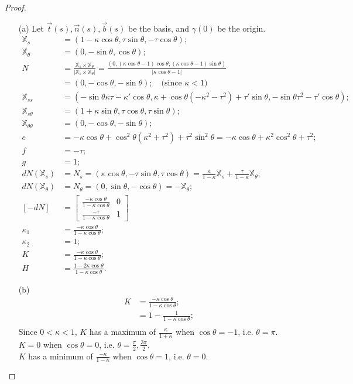 \documentclass[10pt,a4paper]{article}
\begin{document}
\begin{proof}
\begin{enumerate}
\item[(a)] 
Let $\vec{t}(s), \vec{n}(s), \vec{b}(s)$ be the basis, and $\gamma(0)$ be the origin.
\begin{align*}
\mathbb{X}_{s} &= (1 - \kappa\cos\theta, \tau\sin\theta, -\tau\cos\theta); \\
\mathbb{X}_{\theta} &= (0, -\sin\theta, \cos\theta); \\
N &= \frac{\mathbb{X}_{s} \times \mathbb{X}_{\theta}}{|\mathbb{X}_{s} \times \mathbb{X}_{\theta}|} = \frac{(0, (\kappa\cos\theta - 1)\cos\theta, (\kappa\cos\theta - 1)\sin\theta)}{|\kappa\cos\theta - 1|} \\
  &= (0, -\cos\theta, -\sin\theta); \quad\text{(since $\kappa< 1$)} \\
\mathbb{X}_{ss} &= (-\sin\theta\kappa\tau - \kappa'\cos\theta, \kappa + \cos\theta(-\kappa^2 - \tau^2) + \tau'\sin\theta, -\sin\theta\tau^2 - \tau'\cos\theta); \\
\mathbb{X}_{s\theta} &= (1 + \kappa\sin\theta, \tau\cos\theta, \tau\sin\theta); \\
\mathbb{X}_{\theta\theta} &= (0, -\cos\theta, -\sin\theta); \\
e &= -\kappa\cos\theta + \cos^2\theta(\kappa^2 + \tau^2) + \tau^2\sin^2\theta = -\kappa\cos\theta + \kappa^2\cos^2\theta + \tau^2; \\
f &= -\tau; \\
g &= 1; \\
dN(\mathbb{X}_{s}) &= N_{s} = (\kappa\cos\theta, -\tau\sin\theta, \tau\cos\theta) = \frac{\kappa}{1-\kappa}\mathbb{X}_{s} + \frac{\tau}{1-\kappa}\mathbb{X}_{\theta}; \\
dN(\mathbb{X}_{\theta}) &= N_{\theta} = (0, \sin\theta, -\cos\theta) = -\mathbb{X}_{\theta}; \\
[-dN] &= \left[\begin{array}{cc} \frac{-\kappa\cos\theta}{1-\kappa\cos\theta} & 0 \\ \frac{-\tau}{1-\kappa\cos\theta}  & 1\end{array}\right] \\
\kappa_1 &= \frac{-\kappa\cos\theta}{1-\kappa\cos\theta}; \\
\kappa_2 &= 1; \\
K &= \frac{-\kappa\cos\theta}{1-\kappa\cos\theta}; \\
H &= \frac{1-2\kappa\cos\theta}{1-\kappa\cos\theta}.
\end{align*}
\item[(b)] 
\begin{align*}
K &= \frac{-\kappa\cos\theta}{1-\kappa\cos\theta};\\
&= 1-\frac{1}{1-\kappa\cos\theta};\\
\end{align*}
Since $0<\kappa<1$, $K$ has a maximum of $\frac{\kappa}{1+\kappa}$ when $\cos\theta = -1$, i.e. $\theta = \pi$.\\
$K=0$ when $\cos\theta = 0$, i.e. $\theta = \frac{\pi}{2},\frac{3\pi}{2}$.\\
$K$ has a minimum of $\frac{-\kappa}{1-\kappa}$ when $\cos\theta = 1$, i.e. $\theta = 0$.
\end{enumerate}
\end{proof}
\end{document}
